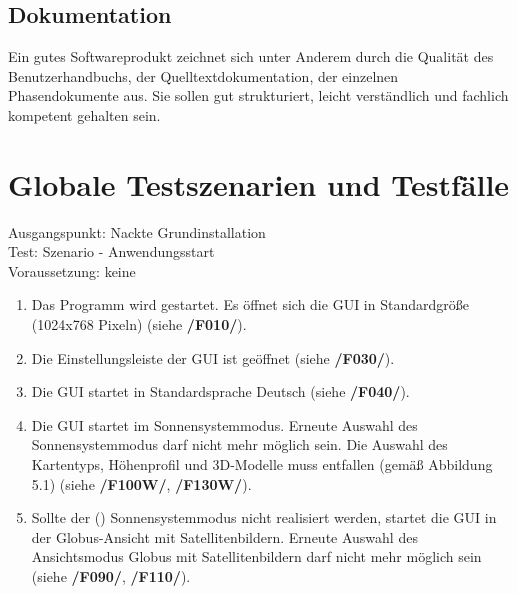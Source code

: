 \documentclass[10pt]{scrreprt}
\begin{document}
\section*{Dokumentation}
Ein gutes Softwareprodukt zeichnet sich unter Anderem durch die Qualität des Benutzerhandbuchs, der Quelltextdokumentation, der einzelnen Phasendokumente aus. Sie sollen gut strukturiert, leicht verständlich und fachlich kompetent gehalten sein. 




\chapter{Globale Testszenarien und Testfälle}

\renewcommand{\muss}{\renewcommand{\labelenumi}{\textbf{/T\numprint{\theenumi}0/}}}
\renewcommand{\wunsch}{\renewcommand{\labelenumi}{\textbf{/T\numprint{\theenumi}0W/}}}
\muss 

Ausgangspunkt: Nackte Grundinstallation \\
Test: Szenario - Anwendungsstart \\
Voraussetzung: keine
\begin{enumerate}[leftmargin = 2.5cm]
\item Das Programm wird gestartet. Es öffnet sich die GUI in Standardgröße (1024x768 Pixeln) (siehe \textbf{/F010/}).
\item Die Einstellungsleiste der GUI ist geöffnet (siehe \textbf{/F030/}).
\item Die GUI startet in Standardsprache Deutsch (siehe \textbf{/F040/}).
\wunsch
\item Die GUI startet im Sonnensystemmodus. Erneute Auswahl des Sonnensystemmodus darf nicht mehr möglich sein. Die Auswahl des Kartentyps, Höhenprofil und 3D-Modelle muss entfallen (gemäß Abbildung 5.1) (siehe \textbf{/F100W/}, \textbf{/F130W/}).
\muss
\item Sollte der (\W) Sonnensystemmodus nicht realisiert werden, startet die GUI in der Globus-Ansicht mit Satellitenbildern. Erneute Auswahl des Ansichtsmodus Globus mit Satellitenbildern darf nicht mehr möglich sein (siehe \textbf{/F090/}, \textbf{/F110/}).
\end{enumerate}
\end{document}
